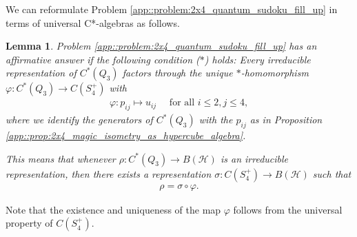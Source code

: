 \documentclass[a4paper]{amsart}
\newtheorem{lemma}[thm]{Lemma}
\begin{document}
We can reformulate Problem \ref{app::problem:2x4_quantum_sudoku_fill_up} in terms of universal C*-algebras as follows.

\begin{lemma}
    \label{app::lemma:reformulation_of_quantum_sudoku_fill_up_problem}
    Problem \ref{app::problem:2x4_quantum_sudoku_fill_up} has an affirmative answer if the following condition ($\ast$) holds: Every irreducible representation of $C^\ast(Q_3)$ factors through the unique $\ast$-homomorphism $\varphi: C^\ast(Q_3) \to C(S_4^+)$ with
    \begin{align*}
        \label{hyp::eq:phi_map_from_C*(Q3)_to_C(S4+)}
        \varphi: p_{ij} \mapsto u_{ij} \quad \text{ for all } i \leq 2, j \leq 4,
    \end{align*}
    where we identify the generators of $C^\ast(Q_3)$ with the $p_{ij}$ as in Proposition \ref{app::prop:2x4_magic_isometry_as_hypercube_algebra}. 
    
    This means that whenever $\rho: C^\ast(Q_3) \to B(\mathcal{H})$ is an irreducible representation, then there exists a  representation $\sigma: C(S_4^+) \to B(\mathcal{H})$ such that
    \begin{align*}
        \rho = \sigma \circ \varphi.
    \end{align*}
\end{lemma}

Note that the existence and uniqueness of the map $\varphi$ follows from the universal property of $C(S_4^+)$.
\end{document}
